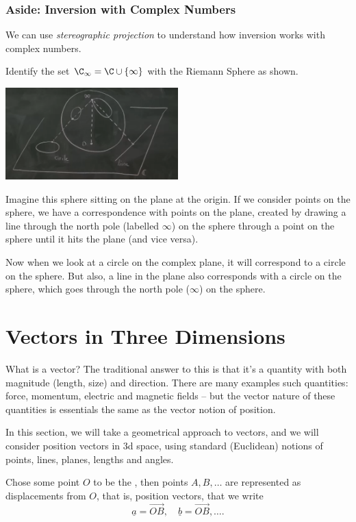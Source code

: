 \documentclass[a4]{scrartcl}
\begin{document}
\subsubsection*{Aside: Inversion with Complex Numbers}

We can use \emph{stereographic projection} to understand how inversion works with complex numbers.

Identify the set $\C_\infty = \C \cup \{\infty\}$ with the Riemann Sphere as shown.
\begin{center}
	\includegraphics[width=0.5\textwidth]{riemann_sphere.png}
\end{center}
Imagine this sphere sitting on the plane at the origin. If we consider points on the sphere, we have a correspondence with points on the plane, created by drawing a line through the north pole (labelled $\infty$) on the sphere through a point on the sphere until it hits the plane (and vice versa). 

Now when we look at a circle on the complex plane, it will correspond to a circle on the sphere. But also, a line in the plane also corresponds with a circle on the sphere, which goes through the north pole ($\infty$) on the sphere.

\clearpage
\section{Vectors in Three Dimensions}

What is a vector? The traditional answer to this is that it's a quantity with both magnitude (length, size) and direction.
There are many examples such quantities: force, momentum, electric and magnetic fields -- but the vector nature of these quantities is essentials the same as the vector notion of position.

In this section, we will take a geometrical approach to vectors, and we will consider position vectors in 3d space, using standard (Euclidean) notions of points, lines, planes, lengths and angles.

Chose some point $O$ to be the , then points $A, B, \dots$ are represented as displacements from $O$, that is, position vectors, that we write
$$
\underline{a} = \overrightarrow{OB}, \quad \underline{b} = \overrightarrow{OB}, \dots.
$$
\end{document}
